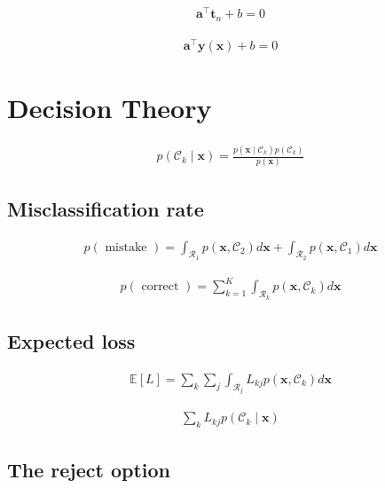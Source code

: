 \documentclass{article}
\begin{document}
\begin{align*}
\mathbf{a}^{\top} \mathbf{t}_n + b = 0
\tag{5.17}
\end{align*}

\begin{align*}
\mathbf{a}^{\top} \mathbf{y}(\mathbf{x}) + b = 0
\tag{5.18}
\end{align*}


\section{Decision Theory}

\begin{align*}
p\left(\mathcal{C}_k \mid \mathbf{x}\right) = \frac{p\left(\mathbf{x} \mid \mathcal{C}_k\right) p\left(\mathcal{C}_k\right)}{p(\mathbf{x})}
\tag{5.19}
\end{align*}

\subsection{Misclassification rate}

\begin{align*}
p(\text{ mistake }) = \int_{\mathcal{R}_{1}} p\left(\mathbf{x}, \mathcal{C}_2\right) d\mathbf{x} + \int_{\mathcal{R}_{2}} p\left(\mathbf{x}, \mathcal{C}_1\right) d\mathbf{x}
\tag{5.20}
\end{align*}

\begin{align*}
p(\text{ correct }) = \sum_{k=1}^K \int_{\mathcal{R}_{k}} p\left(\mathbf{x}, \mathcal{C}_k\right) d\mathbf{x}
\tag{5.21}
\end{align*}

\subsection{Expected loss}

\begin{align*}
\mathbb{E}[L] = \sum_{k} \sum_{j} \int_{\mathcal{R}_{j}} L_{kj} p\left(\mathbf{x}, \mathcal{C}_k\right) d\mathbf{x}
\tag{5.22}
\end{align*}

\begin{align*}
\sum_{k} L_{kj} p\left(\mathcal{C}_k \mid \mathbf{x}\right)
\tag{5.23}
\end{align*}

\subsection{The reject option}
\end{document}
